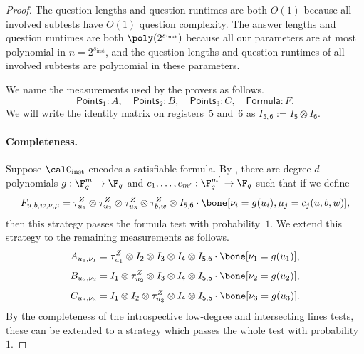 \documentclass[11pt]{article}
\newcommand{\reg}[1]{{\mathsf{#1}}}
\begin{document}
\begin{proof}
The question lengths and question runtimes are both $O(1)$ because all involved subtests have $O(1)$ question complexity.
The answer lengths and question runtimes are both $\poly(2^{s_{\mathrm{inst}}})$
because all our parameters are at most polynomial in $n = 2^{s_{\mathrm{inst}}}$,
and the question lengths and question runtimes of all involved subtests are polynomial in these parameters.

We name the measurements used by the provers as follows.
\begin{equation*}
\mathsf{Points}_1: A,\quad
\mathsf{Points}_2: B,\quad
\mathsf{Points}_3: C,\quad
\mathsf{Formula}: F.
\end{equation*}
We will write the identity matrix on registers~$5$ and~$6$ as $I_{\reg{5, 6}} := I_{\reg{5}} \otimes I_{\reg{6}}$.

\paragraph{Completeness.}
Suppose $\calC_{\mathrm{inst}}$ encodes a satisfiable formula.
By , 
there are degree-$d$ polynomials $g:\F_q^m \rightarrow \F_q$ and $c_1, \ldots, c_{m'}:\F_q^{m'} \rightarrow \F_q$ such that if we define
\begin{equation*}
F_{u, b, w, \nu, \mu} =  \tau^Z_{u_1} \otimes \tau^Z_{u_2} \otimes \tau^Z_{u_3} \otimes \tau^Z_{b, w} \otimes I_{\reg{5,6}} \cdot \bone[\nu_i = g(u_i), \mu_j = c_j(u, b, w)],
\end{equation*}
then this strategy passes the formula test with probability~$1$.
We extend this strategy to the remaining measurements as follows.
\begin{equation*}
A_{u_1, \nu_1}
= \tau^Z_{u_1} \otimes I_{\reg{2}} \otimes I_{\reg{3}} \otimes I_{\reg{4}}\otimes I_{\reg{5,6}}\cdot \bone[\nu_1 = g(u_1)],
\end{equation*}
\begin{equation*}
B_{u_2, \nu_2}
= I_{\reg{1}} \otimes \tau^Z_{u_2} \otimes I_{\reg{3}} \otimes I_{\reg{4}} \otimes I_{\reg{5,6}} \cdot\bone[\nu_2 = g(u_2)],
\end{equation*}
\begin{equation*}
C_{u_3, \nu_3}
= I_{\reg{1}} \otimes I_{\reg{2}} \otimes \tau^Z_{u_3} \otimes I_{\reg{4}} \otimes I_{\reg{5, 6}}\cdot \bone[\nu_3 = g(u_3)].
\end{equation*}
By the completeness of the introspective low-degree and intersecting lines tests, these can be extended to a strategy which passes the whole test with probability~$1$.


\end{proof}
\end{document}
